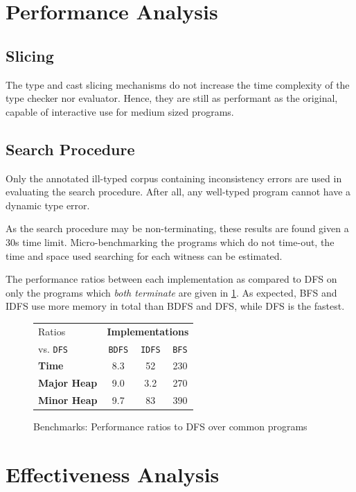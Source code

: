 \section{Performance Analysis}\label{sec:PerformanceAnalysis}
\subsection{Slicing}
The type and cast slicing mechanisms do not increase the time complexity of the type checker nor evaluator. Hence, they are still as performant as the original, capable of interactive use for medium sized programs.

\subsection{Search Procedure}
Only the annotated ill-typed corpus containing inconsistency errors are used in evaluating the search procedure. After all, any well-typed program cannot have a dynamic type error.

As the search procedure may be non-terminating, these results are found given a 30s time limit. Micro-benchmarking the programs which do not time-out, the time and space used searching for each witness can be estimated. 

The performance ratios between each implementation as compared to DFS on only the programs which \textit{both terminate} are given in \cref{fig:SearchPerformanceRatios}. As expected, BFS and IDFS use more memory in total than BDFS and DFS, while DFS is the fastest. 
\begin{figure}
  \centering
  \begin{tabular}{l|ccc}
  Ratios & \multicolumn{3}{c}{\textbf{Implementations}}\\
    vs. \texttt{DFS}& \texttt{BDFS} & \texttt{IDFS} & \texttt{BFS} \\
   \hline
   \textbf{Time} &  8.3 & 52 & 230\\
   \textbf{Major Heap} & 9.0 & 3.2 & 270\\
   \textbf{Minor Heap} & 9.7 & 83 & 390
  \end{tabular}
  
\caption{Benchmarks: Performance ratios to DFS over common programs}
\label{fig:SearchPerformanceRatios}
\end{figure}


\section{Effectiveness Analysis}\label{sec:EffectivenessAnalysis}


